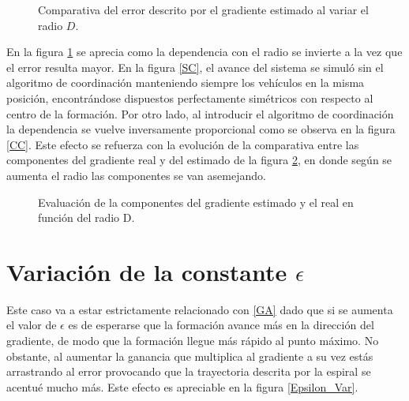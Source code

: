 \begin{figure}[H]
  \begin{center}
    \caption{Comparativa del error descrito por el gradiente estimado al variar el radio $D$.}
    \label{D_Var_Error}
  \end{center}
\end{figure}

En la figura \ref{D_Var_Error} se aprecia como la dependencia con el radio se invierte a la vez que el error resulta mayor. En la figura \ref{SC}, el avance del sistema se simuló sin el algoritmo de coordinación manteniendo siempre los vehículos en la misma posición, encontrándose dispuestos perfectamente simétricos con respecto al centro de la formación. Por otro lado, al introducir el algoritmo de coordinación la dependencia se vuelve inversamente proporcional como se observa en la figura \ref{CC}. Este efecto se refuerza con la evolución de la comparativa entre las componentes del gradiente real y del estimado de la  figura \ref{Gradiente_Var_D}, en donde según se aumenta el radio las componentes se van asemejando.

\begin{figure}[H]
  \begin{center}
    \caption{Evaluación de la componentes del gradiente estimado y el real en función del radio D.}
    \label{Gradiente_Var_D}
  \end{center}
\end{figure}

\section{Variación de la constante $\epsilon$}

Este caso va a estar estrictamente relacionado con \ref{GA} dado que si se aumenta el valor de $\epsilon$ es de esperarse que la formación avance más en la dirección del gradiente, de modo que la formación llegue más rápido al punto máximo. No obstante, al aumentar la ganancia que multiplica al gradiente a su vez estás arrastrando al error provocando que la trayectoria descrita por la espiral se acentué mucho más. Este efecto es apreciable en la figura \ref{Epsilon_Var}.

